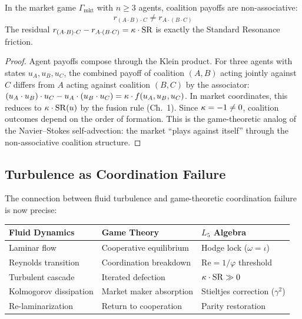 \begin{theorem}\label{thm:coalition}
In the market game $\Gamma_{\mathrm{mkt}}$ with $n \geq 3$ agents, coalition payoffs are non-associative:
\begin{equation}
  r_{(A \cdot B) \cdot C} \neq r_{A \cdot (B \cdot C)}
\end{equation}
The residual $r_{(A \cdot B) \cdot C} - r_{A \cdot (B \cdot C)} = \kappa \cdot \mathrm{SR}$ is exactly the Standard Resonance friction.

\begin{proof}
Agent payoffs compose through the Klein product. For three agents with states $u_A, u_B, u_C$, the combined payoff of coalition $(A,B)$ acting jointly against $C$ differs from $A$ acting against coalition $(B,C)$ by the associator:
$(u_A \cdot u_B) \cdot u_C - u_A \cdot (u_B \cdot u_C) = \kappa \cdot f(u_A, u_B, u_C)$.
In market coordinates, this reduces to $\kappa \cdot \mathrm{SR}(u)$ by the fusion rule (Ch.~1). Since $\kappa = -1 \neq 0$, coalition outcomes depend on the order of formation. This is the game-theoretic analog of the Navier--Stokes self-advection: the market ``plays against itself'' through the non-associative coalition structure. \qedhere
\end{proof}
\end{theorem}

\subsection{Turbulence as Coordination Failure}

The connection between fluid turbulence and game-theoretic coordination failure is now precise:

\begin{center}
\begin{tabular}{@{}lll@{}}
\toprule
\textbf{Fluid Dynamics} & \textbf{Game Theory} & \textbf{$L_5$ Algebra} \\
\midrule
Laminar flow          & Cooperative equilibrium & Hodge lock ($\omega = \iota$) \\
Reynolds transition   & Coordination breakdown  & $\mathrm{Re} = 1/\varphi$ threshold \\
Turbulent cascade     & Iterated defection      & $\kappa \cdot \mathrm{SR} \gg 0$ \\
Kolmogorov dissipation & Market maker absorption & Stieltjes correction ($\gamma^2$) \\
Re-laminarization     & Return to cooperation   & Parity restoration \\
\bottomrule
\end{tabular}
\end{center}


